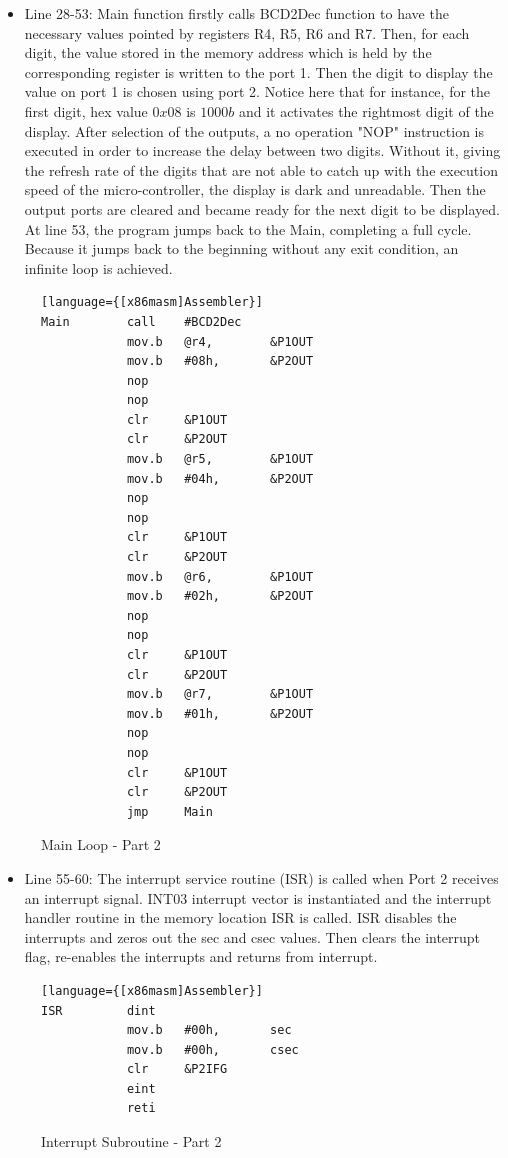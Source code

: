 \documentclass[pdftex,12pt,a4paper]{article}
\begin{document}
\begin{itemize}
    \item Line 28-53: Main function firstly calls BCD2Dec function to have the necessary values pointed by registers R4, R5, R6 and R7. Then, for each digit, the value stored in the memory address which is held by the corresponding register is written to the port 1. Then the digit to display the value on port 1 is chosen using port 2. Notice here that for instance, for the first digit, hex value $0x08$ is $1000b$ and it activates the rightmost digit of the display. After selection of the outputs, a no operation "NOP" instruction is executed in order to increase the delay between two digits. Without it, giving the refresh rate of the digits that are not able to catch up with the execution speed of the micro-controller, the display is dark and unreadable. Then the output ports are cleared and became ready for the next digit to be displayed. At line 53, the program jumps back to the Main, completing a full cycle. Because it jumps back to the beginning without any exit condition, an infinite loop is achieved.\end{itemize}
    
\begin{figure}[H]
    \centering
    \begin{lstlisting}[firstnumber=28][language={[x86masm]Assembler}]
Main		call	#BCD2Dec
			mov.b	@r4,		&P1OUT
			mov.b	#08h,		&P2OUT
			nop
			nop
			clr		&P1OUT
			clr		&P2OUT
			mov.b	@r5,		&P1OUT
			mov.b	#04h,		&P2OUT
			nop
			nop
			clr		&P1OUT
			clr		&P2OUT
			mov.b	@r6,		&P1OUT
			mov.b	#02h,		&P2OUT
			nop
			nop
			clr		&P1OUT
			clr		&P2OUT
			mov.b	@r7,		&P1OUT
			mov.b	#01h,		&P2OUT
			nop
			nop
			clr		&P1OUT
			clr		&P2OUT
			jmp		Main
    \end{lstlisting}
    \label{code:part1delay}
    \caption{Main Loop - Part 2}
\end{figure}

\begin{itemize}
    \item Line 55-60: The interrupt service routine (ISR) is called when Port 2 receives an interrupt signal. INT03 interrupt vector is instantiated and the interrupt handler routine in the memory location ISR is called. ISR disables the interrupts and zeros out the sec and csec values. Then clears the interrupt flag, re-enables the interrupts and returns from interrupt.
    
\end{itemize}
\begin{figure}[H]
    \centering
    \begin{lstlisting}[firstnumber=55][language={[x86masm]Assembler}]
ISR			dint
			mov.b 	#00h,  		sec
			mov.b	#00h,		csec
			clr		&P2IFG
			eint
			reti

    \end{lstlisting}
    \label{code:part1delay}
    \caption{Interrupt Subroutine - Part 2}
\end{figure}
\end{document}
